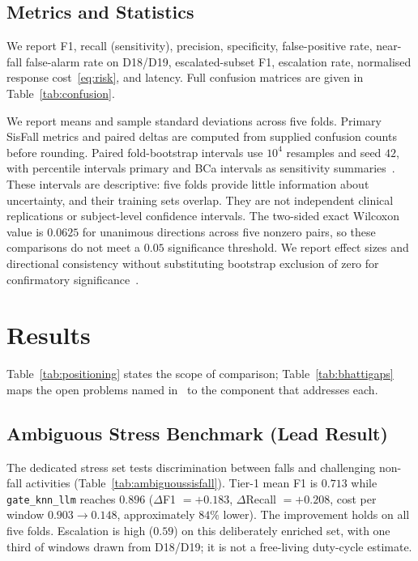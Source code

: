 \documentclass[journal]{IEEEtran}
\begin{document}
\subsection{Metrics and Statistics}
We report F1, recall (sensitivity), precision, specificity, false-positive rate, near-fall false-alarm rate on D18/D19, escalated-subset F1, escalation rate, normalised response cost~\eqref{eq:risk}, and latency. Full confusion matrices are given in Table~\ref{tab:confusion}.

We report means and sample standard deviations across five folds. Primary SisFall metrics and paired deltas are computed from supplied confusion counts before rounding. Paired fold-bootstrap intervals use $10^4$ resamples and seed $42$, with percentile intervals primary and BCa intervals as sensitivity summaries~\cite{efron1987bca}. These intervals are descriptive: five folds provide little information about uncertainty, and their training sets overlap. They are not independent clinical replications or subject-level confidence intervals. The two-sided exact Wilcoxon value is $0.0625$ for unanimous directions across five nonzero pairs, so these comparisons do not meet a $0.05$ significance threshold. We report effect sizes and directional consistency without substituting bootstrap exclusion of zero for confirmatory significance~\cite{demsar2006statistical}.

\section{Results}
\label{sec:results}

Table~\ref{tab:positioning} states the scope of comparison; Table~\ref{tab:bhattigaps} maps the open problems named in~\cite{bhatti2025beyond} to the component that addresses each.




\subsection{Ambiguous Stress Benchmark (Lead Result)}
\label{sec:ambiguous}
The dedicated stress set tests discrimination between falls and challenging non-fall activities (Table~\ref{tab:ambiguoussisfall}). Tier-1 mean F1 is $0.713$ while \texttt{gate\_knn\_llm} reaches $0.896$ ($\Delta$F1 $=+0.183$, $\Delta$Recall $=+0.208$, cost per window $0.903{\rightarrow}0.148$, approximately $84\%$ lower). The improvement holds on all five folds. Escalation is high ($0.59$) on this deliberately enriched set, with one third of windows drawn from D18/D19; it is not a free-living duty-cycle estimate.
\end{document}
